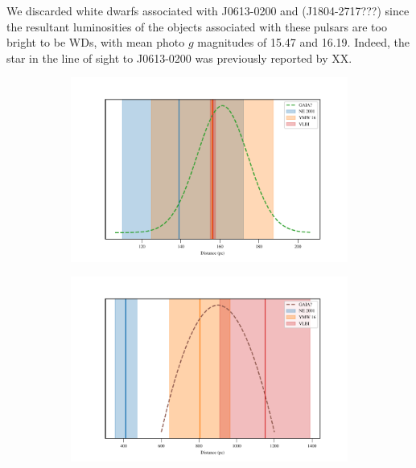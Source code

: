 \documentclass[iop,apj]{emulateapj}
\begin{document}
%
We discarded white dwarfs associated with J0613-0200 and (J1804-2717???) since the resultant luminosities of the objects associated with these pulsars are too bright to be WDs, with mean photo $g$ magnitudes of 15.47 and 16.19. Indeed, the star in the line of sight to J0613-0200 was previously reported by XX.


\begin{figure}
\centering
    \begin{subfigure}
        \centering
        \includegraphics[scale=.5]{../figures/J0437_distances.pdf}
        \caption{}\label{fig:fig_a}
    \end{subfigure} %

    \begin{subfigure}
        \centering
        \includegraphics[scale=.5]{../figures/J1012_distances.pdf}
        \caption{}\label{fig:fig_b}
    \end{subfigure} %
    

\end{figure}
\end{document}
